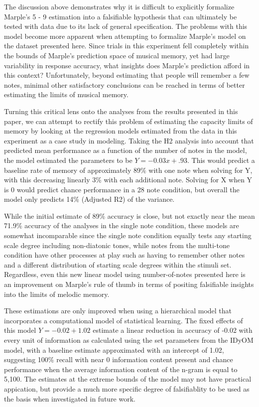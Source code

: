 \documentclass[english,man,floatsintext]{apa6}
\begin{document}
The discussion above demonstrates why it is difficult to explicitly formalize Marple's 5 - 9 estimation into a falsifiable hypothesis that can ultimately be tested with data due to its lack of general specification.
The problems with this model become more apparent when attempting to formalize Marple's model on the dataset presented here.
Since trials in this experiment fell completely within the bounds of Marple's prediction space of musical memory, yet had large variability in response accuracy, what insights does Marple's prediction afford in this context?
Unfortunately, beyond estimating that people will remember a few notes, minimal other satisfactory conclusions can be reached in terms of better estimating the limits of musical memory.

Turning this critical lens onto the analyses from the results presented in this paper, we can attempt to rectify this problem of estimating the capacity limits of memory by looking at the regression models estimated from the data in this experiment as a case study in modeling.
Taking the H2 analysis into account that predicted mean performance as a function of the number of notes in the model, the model estimated the parameters to be \(Y = -0.03x + .93\).
This would predict a baseline rate of memory of approximately 89\% with one note when solving for Y, with this decreasing linearly 3\% with each additional note. Solving for X when Y is 0 would predict chance performance in a 28 note condition, but overall the model only predicts 14\% (Adjusted R2) of the variance.

While the initial estimate of 89\% accuracy is close, but not exactly near the mean 71.9\% accuracy of the analyses in the single note condition, these models are somewhat incomparable since the single note condition equally tests any starting scale degree including non-diatonic tones, while notes from the multi-tone condition have other processes at play such as having to remember other notes and a different distribution of starting scale degrees within the stimuli set.
Regardless, even this new linear model using number-of-notes presented here is an improvement on Marple's rule of thumb in terms of positing falsifiable insights into the limits of melodic memory.

These estimations are only improved when using a hierarchical model that incorporates a computational model of statistical learning.
The fixed effects of this model \(Y = -0.02 + 1.02\) estimate a linear reduction in accuracy of -0.02 with every unit of information as calculated using the set parameters from the IDyOM model, with a baseline estimate approximated with an intercept of 1.02, suggesting 100\% recall with near 0 information content present and chance performance when the average information content of the n-gram is equal to 5,100.
The estimates at the extreme bounds of the model may not have practical appication, but provide a much more specific degree of falsifiablity to be used as the basis when investigated in future work.
\end{document}
